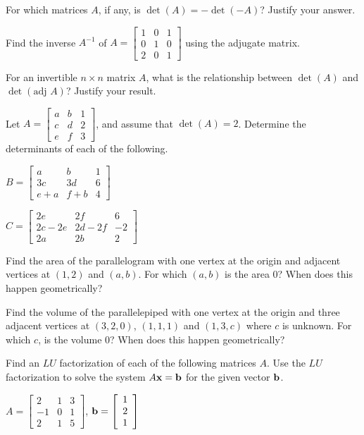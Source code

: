 \ea

\item For which matrices $A$, if any, is $\det(A)=-\det(-A)$? Justify your answer. 

\item Find the inverse $A^{-1}$ of $A=\left[ \begin{array}{ccc} 1&0&1 \\ 0&1&0\\2&0&1\end{array} \right]$ using the adjugate matrix.

\item For an invertible $n\times n$ matrix $A$, what is the relationship between $\det(A)$ and $\det(\text{adj }A)$? Justify your result. 

\item Let $A = \left[ \begin{array}{ccc} a&b&1\\c&d&2\\e&f&3 \end{array} \right]$, and assume that $\det(A) = 2$. Determine the determinants of each of the following.
\ba
\item $B= \left[ \begin{array}{ccc} a&b&1\\3c&3d&6\\e+a&f+b&4 \end{array} \right] $

\item $C =  \left[ \begin{array}{ccr} 2e&2f&6 \\2c-2e&2d-2f&-2\\2a&2b&2 \end{array} \right]$

\ea

\item Find the area of the parallelogram with one vertex at the origin and adjacent vertices at $(1,2)$ and $(a,b)$. For which $(a,b)$ is the area 0? When does this happen geometrically?

\item Find the volume of the parallelepiped with one vertex at the origin and three adjacent vertices at $(3,2,0)$, $(1,1,1)$ and $(1,3,c)$ where $c$ is unknown. For which $c$, is the volume 0? When does this happen geometrically?

\item Find an $LU$ factorization of each of the following matrices $A$. Use the $LU$ factorization to solve the system $A \mathbf{x} = \mathbf{b}$ for the given vector $\mathbf{b}$.
	\ba
	\item $A = \left[ \begin{array}{rcc} 2&1&3 \\ -1&0&1 \\ 2&1&5 \end{array} \right]$, $\mathbf{b} = \left[ \begin{array}{c} 1 \\ 2 \\ 1 \end{array} \right]$
	
